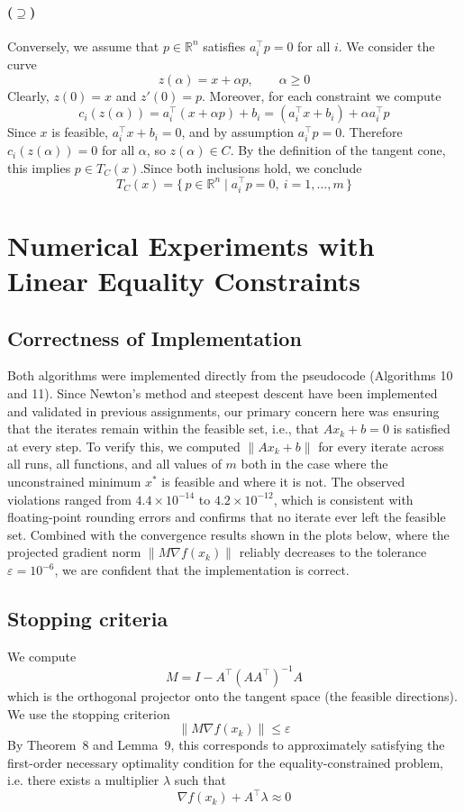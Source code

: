 \documentclass[11pt,a4paper]{article}
\begin{document}
\paragraph{($\supseteq$)} 
Conversely, we assume that $p \in \mathbb{R}^n$ satisfies $a_i^\top p = 0$ for all $i$. We consider the curve
\[
z(\alpha) = x + \alpha p,
\qquad \alpha \ge 0
\]
Clearly, $z(0)=x$ and $z'(0)=p$. Moreover, for each constraint we compute
\[
c_i(z(\alpha))
= a_i^\top (x+\alpha p) + b_i
= (a_i^\top x + b_i) + \alpha a_i^\top p
\]
Since $x$ is feasible, $a_i^\top x + b_i = 0$, and by assumption $a_i^\top p=0$.  
Therefore $c_i(z(\alpha))=0$ for all $\alpha$, so $z(\alpha)\in C$.
\newline
\newline
By the definition of the tangent cone, this implies $p \in T_C(x)$.Since both inclusions hold, we conclude
\[
T_C(x)=\{\,p\in\mathbb{R}^n \mid a_i^\top p = 0,\ i=1,\dots,m\,\}
\]

\section{Numerical Experiments with Linear Equality Constraints}

\subsection{Correctness of Implementation}
Both algorithms were implemented directly from the pseudocode (Algorithms 10 and 11).
Since Newton's method and steepest descent have been implemented and validated in
previous assignments, our primary concern here was ensuring that the iterates remain
within the feasible set, i.e., that $Ax_k + b = 0$ is satisfied at every step.
To verify this, we computed $\|Ax_k + b\|$ for every iterate across all runs, all
functions, and all values of $m$ both in the case where the unconstrained minimum
$x^*$ is feasible and where it is not. The observed violations ranged from
$4.4 \times 10^{-14}$ to $4.2 \times 10^{-12}$, which is consistent with
floating-point rounding errors and confirms that no iterate ever left the feasible set.
Combined with the convergence results shown in the plots below, where the projected
gradient norm $\|M \nabla f(x_k)\|$ reliably decreases to the tolerance
$\varepsilon = 10^{-6}$, we are confident that the implementation is correct.

\subsection{Stopping criteria}
We compute
\[
M = I - A^\top(AA^\top)^{-1}A
\]
which is the orthogonal projector onto the tangent space (the feasible
directions). We use the stopping criterion
\[
\|M \nabla f(x_k)\| \le \varepsilon
\]
By Theorem~8 and Lemma~9, this corresponds to approximately satisfying
the first-order necessary optimality condition for the equality-constrained
problem, i.e. there exists a multiplier $\lambda$ such that
\[
\nabla f(x_k) + A^\top \lambda \approx 0
\]
\end{document}
